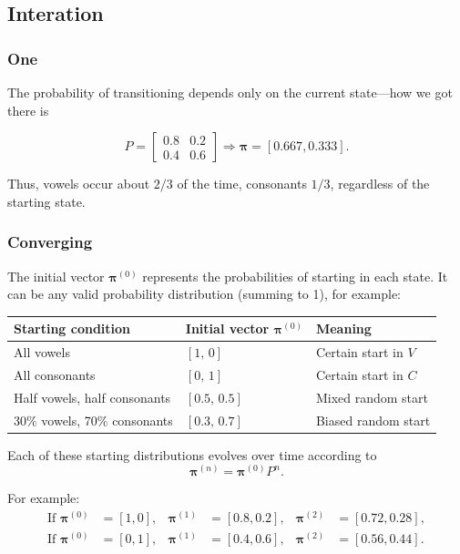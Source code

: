 \subsection{Interation}
\subsubsection{One}
The probability of transitioning depends only on the current state—how we got there is 




\[
P =
\begin{bmatrix}
0.8 & 0.2 \\
0.4 & 0.6
\end{bmatrix}
\Rightarrow
\boldsymbol{\pi} = [0.667, 0.333].
\]

Thus, vowels occur about $2/3$ of the time, consonants $1/3$, regardless of the starting state.


\subsubsection{Converging}

The initial vector $\boldsymbol{\pi}^{(0)}$ represents the probabilities of starting in each state.  
It can be any valid probability distribution (summing to 1), for example:

\begin{center}
\begin{tabular}{@{}lll@{}}
\toprule
\textbf{Starting condition} & \textbf{Initial vector $\boldsymbol{\pi}^{(0)}$} & \textbf{Meaning} \\ \midrule
All vowels & $[1,\, 0]$ & Certain start in $V$ \\
All consonants & $[0,\, 1]$ & Certain start in $C$ \\
Half vowels, half consonants & $[0.5,\, 0.5]$ & Mixed random start \\
30\% vowels, 70\% consonants & $[0.3,\, 0.7]$ & Biased random start \\
\bottomrule
\end{tabular}
\end{center}

Each of these starting distributions evolves over time according to
\[
\boldsymbol{\pi}^{(n)} = \boldsymbol{\pi}^{(0)} P^n.
\]

For example:
\[
\begin{aligned}
\text{If } \boldsymbol{\pi}^{(0)} &= [1, 0], & \boldsymbol{\pi}^{(1)} &= [0.8, 0.2], & \boldsymbol{\pi}^{(2)} &= [0.72, 0.28], \\
\text{If } \boldsymbol{\pi}^{(0)} &= [0, 1], & \boldsymbol{\pi}^{(1)} &= [0.4, 0.6], & \boldsymbol{\pi}^{(2)} &= [0.56, 0.44].
\end{aligned}
\]


